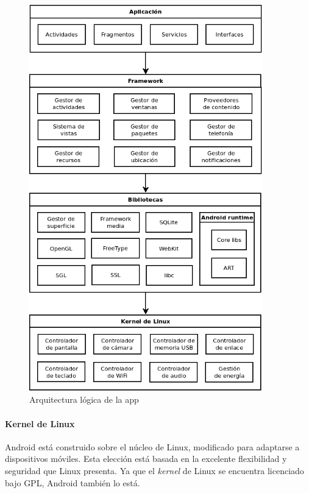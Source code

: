 \begin{figure}[htbp]
  \centering
  \includegraphics[width=0.9\textwidth]{cap5/img/diagrama_arquitectura_logica_app}
  \caption{Arquitectura lógica de la app}
  \label{fig:arquitectura-logica-app}
\end{figure}


\paragraph{Kernel de Linux}

Android está construido sobre el núcleo de Linux, modificado para adaptarse a
dispositivos móviles. Esta elección está basada en la excelente flexibilidad y
seguridad que Linux presenta. Ya que el \textit{kernel} de Linux se encuentra
licenciado bajo \ac{GPL}, Android también lo está.



